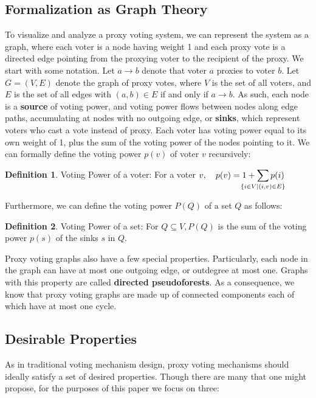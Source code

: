 \documentclass[10pt]{article}
\theoremstyle{definition}
\newtheorem{definition}{Definition}[section]
\begin{document}
\subsection{Formalization as Graph Theory}
To visualize and analyze a proxy voting system, we can represent the system as a graph, where each voter is a node having weight 1 and each proxy vote is a directed edge pointing from the proxying voter to the recipient of the proxy. We start with some notation. Let $a \rightarrow b$ denote that voter $a$ proxies to voter $b$. Let $G = (V,E)$ denote the graph of proxy votes, where $V$ is the set of all voters, and $E$ is the set of all edges with $(a,b) \in E$ if and only if $a \rightarrow b$. As such, each node is a \textbf{source} of voting power, and voting power flows between nodes along edge paths, accumulating at nodes with no outgoing edge, or \textbf{sinks}, which represent voters who cast a vote instead of proxy. Each voter has voting power equal to its own weight of 1, plus the sum of the voting power of the nodes pointing to it. We can formally define the voting power $p(v)$ of voter $v$ recursively:

\theoremstyle{definition}
\begin{definition}{Voting Power of a voter:}
For a voter $v, \quad p(v) = 1 + \smashoperator{\sum\limits_{\{i \in V \mid (i,v) \in E\}}}p(i)$
\end{definition}

Furthermore, we can define the voting power $P(Q)$ of a set $Q$ as follows:

\theoremstyle{definition}
\begin{definition}{Voting Power of a set:}
For $Q \subseteq V, P(Q)$ is the sum of the voting power $p(s)$ of the sinks $s$ in $Q$.
\end{definition}



Proxy voting graphs also have a few special properties. Particularly, each node in the graph can have at most one outgoing edge, or outdegree at most one. Graphs with this property are called \textbf{directed pseudoforests}. As a consequence, we know that proxy voting graphs are made up of connected components each of which have at most one cycle.


\subsection{Desirable Properties}
As in traditional voting mechanism design, proxy voting mechanisms should ideally satisfy a set of desired properties. Though there are many that one might propose, for the purposes of this paper we focus on three:
\end{document}
